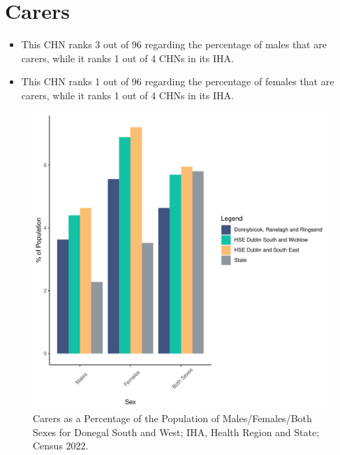 \documentclass{article}
\begin{document}
\section{Carers}\label{sect:Carers}
\begin{itemize}
\item This CHN ranks  3 out of 96 regarding the percentage of males that are carers, while it ranks   1 out of 4 CHNs in its IHA.
\item This CHN ranks  1 out of 96 regarding the percentage of females that are carers, while it ranks   1 out of 4 CHNs in its IHA.
\end{itemize}
\begin{figure}[H]
	\centering
	\includegraphics[width = 150mm]{../figures/CareED.pdf}
	\caption{Carers as a Percentage of the Population of Males/Females/Both Sexes for Donegal South and West; IHA, Health Region and State; Census 2022.}
	\label{fig:2ae19629-1a6a-13a3-e055-000000000001}
	\end{figure}
\end{document}
